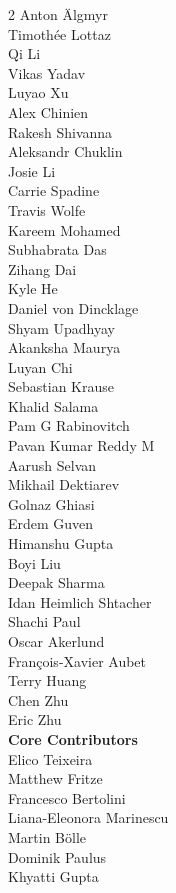 \begin{multicols}{2}
Anton Älgmyr \\
Timothée Lottaz \\
Qi Li \\
Vikas Yadav \\
Luyao Xu \\
Alex Chinien \\
Rakesh Shivanna \\
Aleksandr Chuklin \\
Josie Li \\
Carrie Spadine \\
Travis Wolfe \\
Kareem Mohamed \\
Subhabrata Das \\
Zihang Dai \\
Kyle He \\
Daniel von Dincklage \\
Shyam Upadhyay \\
Akanksha Maurya \\
Luyan Chi \\
Sebastian Krause \\
Khalid Salama \\
Pam G Rabinovitch \\
Pavan Kumar Reddy M \\
Aarush Selvan \\
Mikhail Dektiarev \\
Golnaz Ghiasi \\
Erdem Guven \\
Himanshu Gupta \\
Boyi Liu \\
Deepak Sharma \\
Idan Heimlich Shtacher \\
Shachi Paul \\
Oscar Akerlund \\
François-Xavier Aubet \\
Terry Huang \\
Chen Zhu \\
Eric Zhu \\
\noindent
\textbf{Core Contributors} \\
Elico Teixeira \\
Matthew Fritze \\
Francesco Bertolini \\
Liana-Eleonora Marinescu \\
Martin Bölle \\
Dominik Paulus \\
Khyatti Gupta \\

\end{multicols}
